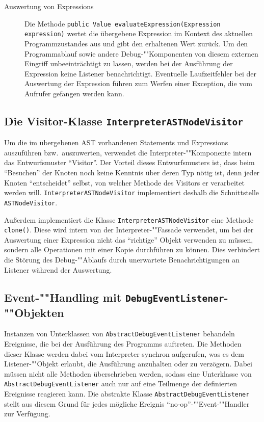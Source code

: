 \begin{description}
    \item[Auswertung von Expressions]
    Die Methode \texttt{public Value evaluateExpression(Expression expression)} wertet die übergebene Expression im Kontext des aktuellen Programmzustandes aus und gibt den erhaltenen Wert zurück. Um den Programmablauf sowie andere Debug-""Komponenten von diesem externen Eingriff unbeeinträchtigt zu lassen, werden bei der Ausführung der Expression keine Listener benachrichtigt. Eventuelle Laufzeitfehler bei der Auswertung der Expression führen zum Werfen einer Exception, die vom Aufrufer gefangen werden kann.
\end{description}

\subsection{Die Visitor-Klasse \texttt{InterpreterASTNodeVisitor}}
Um die im übergebenen AST vorhandenen Statements und Expressions auszuführen bzw.\ auszuwerten, verwendet die Interpreter-""Komponente intern das Entwurfsmuster ``Visitor''. Der Vorteil dieses Entwurfsmusters ist, dass beim ``Besuchen'' der Knoten noch keine Kenntnis über deren Typ nötig ist, denn jeder Knoten ``entscheidet'' selbst, von welcher Methode des Visitors er verarbeitet werden will. \texttt{InterpreterASTNodeVisitor} implementiert deshalb die Schnittstelle \texttt{ASTNodeVisitor}.

Außerdem implementiert die Klasse \texttt{InterpreterASTNodeVisitor} eine Methode \texttt{clone()}. Diese wird intern von der Interpreter-""Fassade verwendet, um bei der Auswertung einer Expression nicht das ``richtige'' Objekt verwenden zu müssen, sondern alle Operationen mit einer Kopie durchführen zu können. Dies verhindert die Störung des Debug-""Ablaufs durch unerwartete Benachrichtigungen an Listener während der Auswertung.

\subsection{Event-""Handling mit \texttt{DebugEventListener}-""Objekten}
Instanzen von Unterklassen von \texttt{AbstractDebugEventListener} behandeln Ereignisse, die bei der Ausführung des Programms auftreten. Die Methoden dieser Klasse werden dabei vom Interpreter synchron aufgerufen, was es dem Listener-""Objekt erlaubt, die Ausführung anzuhalten oder zu verzögern. Dabei müssen nicht alle Methoden überschrieben werden, sodass eine Unterklasse von \texttt{AbstractDebugEventListener} auch nur auf eine Teilmenge der definierten Ereignisse reagieren kann. Die abstrakte Klasse \texttt{AbstractDebugEventListener} stellt aus diesem Grund für jedes mögliche Ereignis ``no-op''-""Event-""Handler zur Verfügung.

